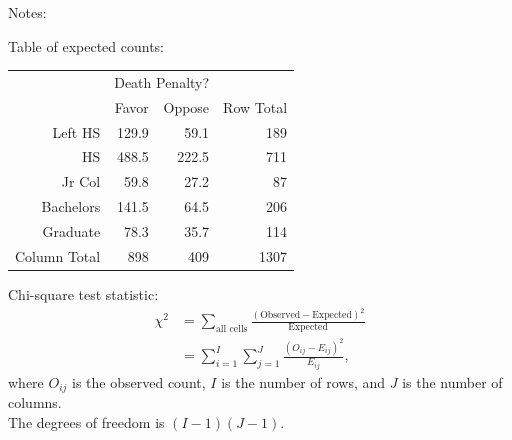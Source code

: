 \documentclass[10pt]{beamer}
\begin{document}
\begin{frame}
\vspace{-4cm}
Notes:
\end{frame}

\begin{frame}
\vspace{-1cm}
Table of expected counts:

\begin{table}[ht]
\centering
\begin{tabular}{rrrr}
\hline
\multicolumn{1}{c}{} &
\multicolumn{2}{c}{Death Penalty?} &
\multicolumn{1}{c}{}\\
\cline{2-3}
& Favor & Oppose & Row Total \\ 
\hline
Left HS & 129.9 & 59.1 & 189\\ 
HS & 488.5 & 222.5 & 711\\ 
Jr Col & 59.8 & 27.2 & 87\\ 
Bachelors & 141.5 & 64.5 & 206\\ 
Graduate & 78.3 & 35.7 & 114\\ 
\hline
Column Total & 898 & 409 & 1307\\ 
\hline
\end{tabular}
\end{table}


\end{frame}

\begin{frame}
Chi-square test statistic:
\begin{align*}
\chi^2 &= \sum_{\text{all cells}} \frac{(\text{Observed} - \text{Expected})^2}{\text{Expected}}\\
&= \sum_{i=1}^I \sum_{j=1}^J \frac{(O_{ij} - E_{ij})^2}{E_{ij}},
\end{align*}
where $O_{ij}$ is the observed count, $I$ is the number of rows, and $J$ is the number of columns.\\
\vspace{10pt}
The degrees of freedom is $(I-1)(J-1)$.\\
\end{frame}
\end{document}
